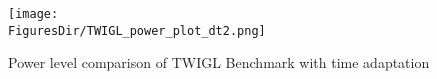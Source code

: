 \begin{figure}[!htbp]
\centering
\texttt{[image: \\FiguresDir/TWIGL\_power\_plot\_dt2.png]}
\caption{Power level comparison of TWIGL Benchmark with time adaptation}
\label{fig:TWIGL_power_dt2}
\end{figure}

%
%
%
%
%

